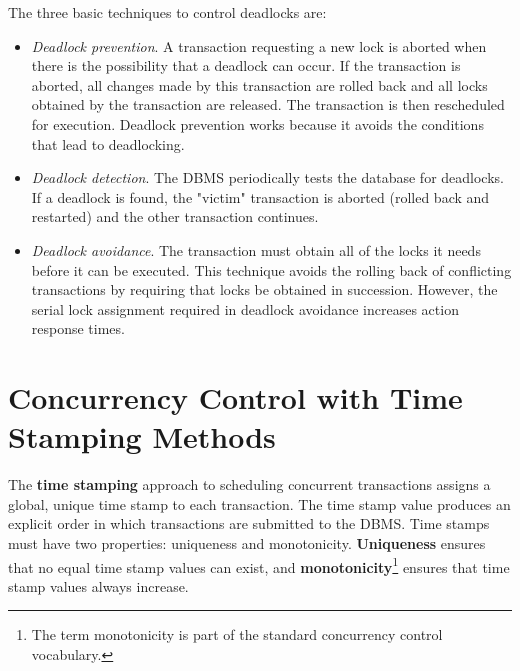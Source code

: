 \documentclass[a4paper, 11pt, titlepage]{report}
\begin{document}
The three basic techniques to control deadlocks are:
\begin{itemize}
\item \textit{Deadlock prevention}. A transaction requesting a new lock is aborted when there is the possibility that a deadlock can occur. If the transaction is aborted, all changes made by this transaction are rolled back and all locks obtained by the transaction are released. The transaction is then rescheduled for execution. Deadlock prevention works because it avoids the conditions that lead to deadlocking.
\item \textit{Deadlock detection}. The DBMS periodically tests the database for deadlocks. If a deadlock is found, the "victim" transaction is aborted (rolled back and restarted) and the other transaction continues.
\item \textit{Deadlock avoidance}. The transaction must obtain all of the locks it needs before it can be executed. This technique avoids the rolling back of conflicting transactions by requiring that locks be obtained in succession. However, the serial lock assignment required in deadlock avoidance increases action response times.
\end{itemize}
\section{Concurrency Control with Time Stamping Methods}
The \textbf{time stamping} approach to scheduling concurrent transactions assigns a global, unique time stamp to each transaction. The time stamp value produces an explicit order in which transactions are submitted to the DBMS. Time stamps must have two properties: uniqueness and monotonicity. \textbf{Uniqueness} ensures that no equal time stamp values can exist, and \textbf{monotonicity}\footnote{The term monotonicity is part of the standard concurrency control vocabulary.} ensures that time stamp values always increase.
\end{document}
